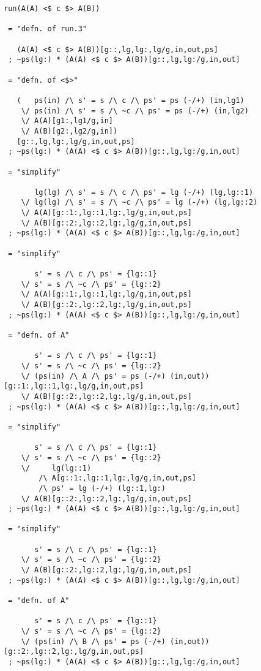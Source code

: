 \begin{verbatim}
run(A(A) <$ c $> A(B))

 = "defn. of run.3"

   (A(A) <$ c $> A(B))[g::,lg,lg:,lg/g,in,out,ps]
 ; ~ps(lg:) * (A(A) <$ c $> A(B))[g::,lg,lg:/g,in,out]

 = "defn. of <$>"

   (   ps(in) /\ s' = s /\ c /\ ps' = ps (-/+) (in,lg1)
    \/ ps(in) /\ s' = s /\ ~c /\ ps' = ps (-/+) (in,lg2)
    \/ A(A)[g1:,lg1/g,in]
    \/ A(B)[g2:,lg2/g,in])
   [g::,lg,lg:,lg/g,in,out,ps]
 ; ~ps(lg:) * (A(A) <$ c $> A(B))[g::,lg,lg:/g,in,out]

 = "simplify"

       lg(lg) /\ s' = s /\ c /\ ps' = lg (-/+) (lg,lg::1)
    \/ lg(lg) /\ s' = s /\ ~c /\ ps' = lg (-/+) (lg,lg::2)
    \/ A(A)[g::1:,lg::1,lg:,lg/g,in,out,ps]
    \/ A(B)[g::2:,lg::2,lg:,lg/g,in,out,ps]
 ; ~ps(lg:) * (A(A) <$ c $> A(B))[g::,lg,lg:/g,in,out]

 = "simplify"

       s' = s /\ c /\ ps' = {lg::1}
    \/ s' = s /\ ~c /\ ps' = {lg::2}
    \/ A(A)[g::1:,lg::1,lg:,lg/g,in,out,ps]
    \/ A(B)[g::2:,lg::2,lg:,lg/g,in,out,ps]
 ; ~ps(lg:) * (A(A) <$ c $> A(B))[g::,lg,lg:/g,in,out]

 = "defn. of A"

       s' = s /\ c /\ ps' = {lg::1}
    \/ s' = s /\ ~c /\ ps' = {lg::2}
    \/ (ps(in) /\ A /\ ps' = ps (-/+) (in,out))[g::1:,lg::1,lg:,lg/g,in,out,ps]
    \/ A(B)[g::2:,lg::2,lg:,lg/g,in,out,ps]
 ; ~ps(lg:) * (A(A) <$ c $> A(B))[g::,lg,lg:/g,in,out]

 = "simplify"

       s' = s /\ c /\ ps' = {lg::1}
    \/ s' = s /\ ~c /\ ps' = {lg::2}
    \/     lg(lg::1)
        /\ A[g::1:,lg::1,lg:,lg/g,in,out,ps]
        /\ ps' = lg (-/+) (lg::1,lg:)
    \/ A(B)[g::2:,lg::2,lg:,lg/g,in,out,ps]
 ; ~ps(lg:) * (A(A) <$ c $> A(B))[g::,lg,lg:/g,in,out]

 = "simplify"

       s' = s /\ c /\ ps' = {lg::1}
    \/ s' = s /\ ~c /\ ps' = {lg::2}
    \/ A(B)[g::2:,lg::2,lg:,lg/g,in,out,ps]
 ; ~ps(lg:) * (A(A) <$ c $> A(B))[g::,lg,lg:/g,in,out]

 = "defn. of A"

       s' = s /\ c /\ ps' = {lg::1}
    \/ s' = s /\ ~c /\ ps' = {lg::2}
    \/ (ps(in) /\ B /\ ps' = ps (-/+) (in,out))[g::2:,lg::2,lg:,lg/g,in,out,ps]
 ; ~ps(lg:) * (A(A) <$ c $> A(B))[g::,lg,lg:/g,in,out]


\end{verbatim}
